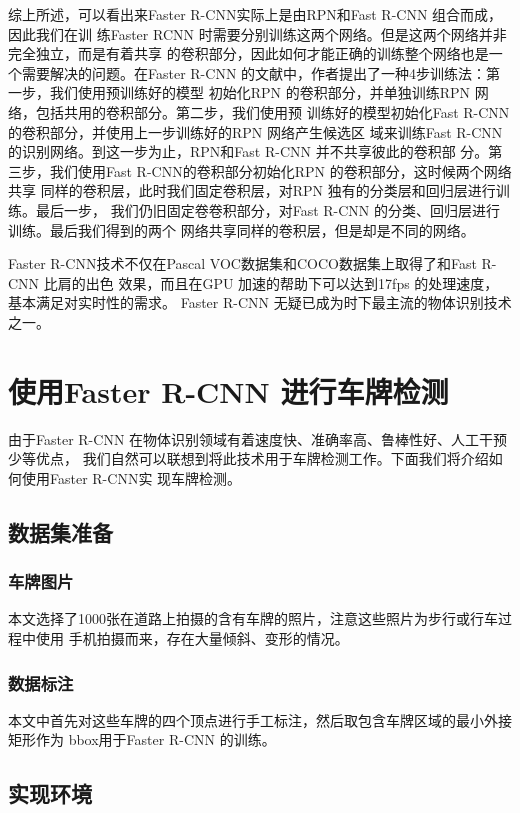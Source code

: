 综上所述，可以看出来Faster R-CNN实际上是由RPN和Fast R-CNN 组合而成，因此我们在训
练Faster RCNN 时需要分别训练这两个网络。但是这两个网络并非完全独立，而是有着共享
的卷积部分，因此如何才能正确的训练整个网络也是一个需要解决的问题。在Faster R-CNN
的文献\cite{Ren:2015ug}中，作者提出了一种4步训练法：第一步，我们使用预训练好的模型
初始化RPN 的卷积部分，并单独训练RPN 网络，包括共用的卷积部分。第二步，我们使用预
训练好的模型初始化Fast R-CNN 的卷积部分，并使用上一步训练好的RPN 网络产生候选区
域来训练Fast R-CNN 的识别网络。到这一步为止，RPN和Fast R-CNN 并不共享彼此的卷积部
分。第三步，我们使用Fast R-CNN的卷积部分初始化RPN 的卷积部分，这时候两个网络共享
同样的卷积层，此时我们固定卷积层，对RPN 独有的分类层和回归层进行训练。最后一步，
我们仍旧固定卷卷积部分，对Fast R-CNN 的分类、回归层进行训练。最后我们得到的两个
网络共享同样的卷积层，但是却是不同的网络。

Faster R-CNN技术不仅在Pascal VOC数据集和COCO数据集上取得了和Fast R-CNN 比肩的出色
效果，而且在GPU 加速的帮助下可以达到17fps 的处理速度，基本满足对实时性的需求。
Faster R-CNN 无疑已成为时下最主流的物体识别技术之一。

\section{使用Faster R-CNN 进行车牌检测}

由于Faster R-CNN 在物体识别领域有着速度快、准确率高、鲁棒性好、人工干预少等优点，
我们自然可以联想到将此技术用于车牌检测工作。下面我们将介绍如何使用Faster R-CNN实
现车牌检测。

\subsection{数据集准备}

\subsubsection{车牌图片}
本文选择了1000张在道路上拍摄的含有车牌的照片，注意这些照片为步行或行车过程中使用
手机拍摄而来，存在大量倾斜、变形的情况。

\subsubsection{数据标注}
本文中首先对这些车牌的四个顶点进行手工标注，然后取包含车牌区域的最小外接矩形作为
bbox用于Faster R-CNN 的训练。 

\subsection{实现环境}

